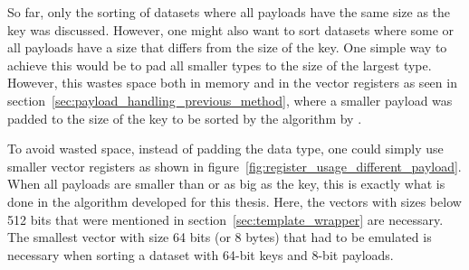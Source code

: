\documentclass[12pt, a4paper, openright, twoside]{tiarbeit}
\begin{document}
So far, only the sorting of datasets where all payloads have the same size as
the key was discussed. However, one might also want to sort datasets where
some or all payloads have a size that differs from the size of the key.
One simple way to achieve this would be to pad all smaller types to the size of the
largest type. However, this wastes space both in memory and in the vector
registers as seen in section~\ref{sec:payload_handling_previous_method}, where
a smaller payload was padded to the size of the key to be sorted by the algorithm
by \citet{moeller_radix}.

To avoid wasted space, instead of padding the data type, one could simply use
smaller vector registers as shown in figure~\ref{fig:register_usage_different_payload}.
When all payloads are smaller than or as big as the key, this is exactly
what is done in the algorithm developed for this thesis.
Here, the vectors with sizes below 512 bits that were mentioned in
section~\ref{sec:template_wrapper}
are necessary. The smallest vector with size 64 bits (or 8 bytes) that
had to be emulated is necessary when sorting a dataset with 64-bit keys and
8-bit payloads.
\end{document}

